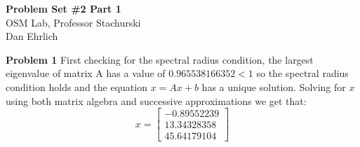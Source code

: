 \documentclass[letterpaper,12pt]{article}
\theoremstyle{definition}
\begin{document}
\begin{flushleft}
  \textbf{\large{Problem Set \#2 Part 1}} \\
  OSM Lab, Professor Stachurski  \\
  Dan Ehrlich
\end{flushleft}

\vspace{3mm}

\noindent\textbf{Problem 1}
First checking for the spectral radius condition, the largest eigenvalue of matrix A has a value of $0.965538166352 < 1$ so the spectral radius condition holds and the equation $x = A x + b$ has a unique solution. Solving for $x$ using both matrix algebra and successive approximations we get that:
\[ x =
\begin{bmatrix}
 -0.89552239 \\
  13.34328358\\
  45.64179104
\end{bmatrix}
\]\\
\end{document}
